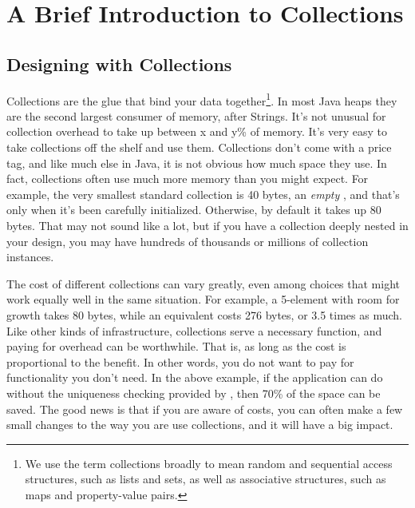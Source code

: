 \chapter{A Brief Introduction to Collections}
\label{chapter:brief-introduction-collections}

\section{Designing with Collections}
Collections are the glue that bind your data together\footnote{We use the term
collections broadly to mean random and sequential access structures, such as
lists and sets, as well as associative structures, such as maps and property-value pairs.}. In most Java heaps they are the second largest consumer of memory,
after Strings.  It's not unusual for collection overhead to take up between
x and y\% of memory. It's very easy to take collections off the shelf
and use them. Collections don't come with a price tag, and like much else
in Java, it is not obvious how much space they use. In fact,
collections often use much more memory than you might expect. For example,
the very smallest standard collection is 40 bytes, an \emph{empty}
, and that's only when it's been carefully initialized. 
Otherwise, by default it takes up 80 bytes. That may not sound like a lot,
but if you have a collection deeply nested in your design, you may have hundreds
of thousands or millions of collection instances.

The cost of different collections can vary greatly, even among choices that
might work equally well in the same situation. For example, a 5-element 
with room for growth takes 80 bytes, while an equivalent  costs 276 bytes, or 3.5 times as much. 
Like other kinds of infrastructure, collections serve a necessary
function, and paying for overhead can be worthwhile.  That is, as long as
the cost is proportional to the benefit. In other words, you do not want to pay
for functionality you don't need. In the above example, if
the application can do without the uniqueness checking provided by
, then 70\% of the space can be saved.  The good news is that
if you are aware of costs, you can often make a few small changes to
the way you are use collections, and it will have a big impact.

